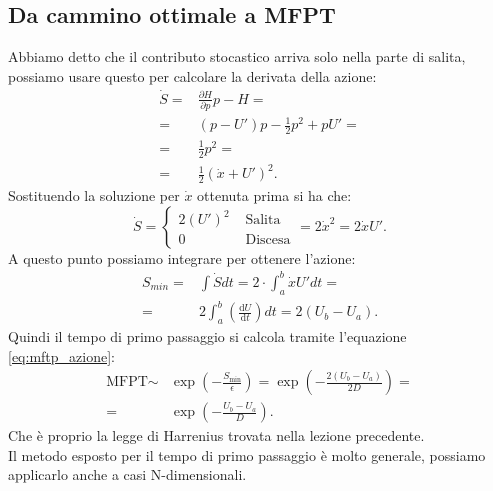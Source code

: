 \subsection{Da cammino ottimale a MFPT}%
\label{sub:Da cammino ottimale a MFPT}
Abbiamo detto che il contributo stocastico arriva solo nella parte di salita, possiamo usare questo per calcolare la derivata della azione:
\begin{equation}
\begin{aligned}
    \dot{S} =& \frac{\partial H}{\partial p} p - H = \\
            =& \left(p-U'\right)p - \frac{1}{2}p^2+pU' = \\
	    =& \frac{1}{2}p^2 = \\
	    =& \frac{1}{2}\left(\dot{x}+U'\right)^2
.\end{aligned}
\label{eq:12_action}
\end{equation}
Sostituendo la soluzione per $\dot{x}$ ottenuta prima si ha che:
\[
    \dot{S} = 
    \begin{cases}
	2(U') ^2 & \text{ Salita}\\
	0        & \text{ Discesa}
    \end{cases}
    = 2 \dot{x}^2 = 2\dot{x}U'
.\] 
A questo punto possiamo integrare per ottenere l'azione:
\[\begin{aligned}
    S_{min} =& \int\dot{S}dt = 
             2\cdot \int_{a}^{b} \dot{x}U'dt = \\
            =& 2  \int_{a}^{b} \left(\frac{\text{d} U}{\text{d} t} \right)dt =
	     2(U_b-U_a)  
.\end{aligned}\]
Quindi il tempo di primo passaggio si calcola tramite l'equazione \ref{eq:mftp_azione}:
\[\begin{aligned}
    \text{MFPT} \sim& \exp\left(-\frac{S_{\text{min}}}{\epsilon}\right) =
    \exp\left(-\frac{2(U_b-U_a)}{2D}\right) =\\
    =&\exp\left(-\frac{U_b-U_a}{D}\right)
.\end{aligned}\]
Che è proprio la legge di Harrenius trovata nella lezione precedente.\\
Il metodo esposto per il tempo di primo passaggio è molto generale, possiamo applicarlo anche a casi N-dimensionali.

